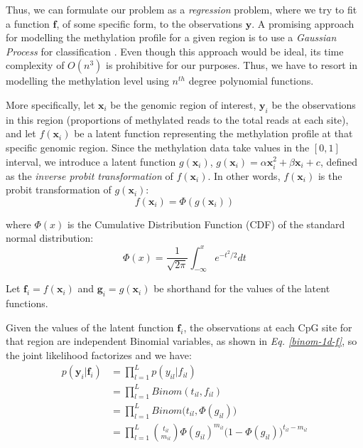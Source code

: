 Thus, we can formulate our problem as a \emph{regression} problem, where we try to fit a function $\mathbf{f}$, of some specific form, to the observations $\mathbf{y}$. A promising approach for modelling the methylation profile for a given region is to use a \emph{Gaussian Process} for classification \citep{Rasmussen2006}. Even though this approach would be ideal, its time complexity of $O(n^{3})$ is prohibitive for our purposes. Thus, we have to resort in modelling the methylation level using $n^{th}$ degree polynomial functions.

More specifically, let $\mathbf{x}_{i}$ be the genomic region of interest, $\mathbf{y}_{i}$ be the observations in this region (\ie proportions of methylated reads to the total reads at each site), and let $f(\mathbf{x}_{i})$ be a latent function representing the methylation profile at that specific genomic region. Since the methylation data take values in the $[0, 1]$ interval, we introduce a latent function $g(\mathbf{x}_{i})$, \eg $g(\mathbf{x}_{i}) = \alpha \mathbf{x}_{i}^{2} + \beta \mathbf{x}_{i} + c$, defined as the \emph{inverse probit transformation} of $f(\mathbf{x}_{i})$. In other words, $f(\mathbf{x}_{i})$ is the probit transformation of $g(\mathbf{x}_{i})$:
\begin{equation} \label{probit-transform-f}
	f(\mathbf{x}_{i}) = \Phi(g(\mathbf{x}_{i}))
\end{equation}

where $\Phi(x)$ is the Cumulative Distribution Function (CDF) of the standard normal distribution:
\begin{equation} \label{cdf-stand-normal-f}
	\Phi(x) = \frac{1}{\sqrt{2\pi}} \int_{-\infty}^{x} e^{-t^{2}/2}dt
\end{equation}

Let $\mathbf{f}_{i} = f(\mathbf{x}_{i})$ and $\mathbf{g}_{i} = g(\mathbf{x}_{i})$ be shorthand for the values of the latent functions.

Given the values of the latent function $\mathbf{f}_{i}$, the observations at each CpG site for that region are independent Binomial variables, as shown in \emph{Eq. \ref{binom-1d-f}}, so the joint likelihood factorizes and we have:
\begin{equation} \label{likel-binom-prob-f}
  \begin{split}
	p(\mathbf{y}_{i}|\mathbf{f}_{i}) & = \prod_{l=1}^{L} p(y_{il}|f_{il}) \\
							 & = \prod_{l=1}^{L} Binom(t_{il}, f_{il}) \\
							 & = \prod_{l=1}^{L} Binom\big(t_{il}, \Phi(g_{il})\big) \\
							 & = \prod_{l=1}^{L} \binom{t_{il}}{m_{il}} \Phi(g_{il})^{m_{il}} (1 - \Phi(g_{il})\big)^{t_{il} - m_{il}}
  \end{split}
\end{equation}

